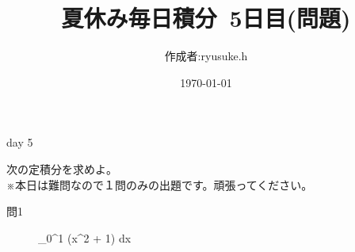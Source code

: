 \documentclass[12pt,a4paper]{jsarticle}
\title{夏休み毎日積分~5日目(問題)}
\date{\today}
\begin{document}
\maketitle
\begin{flushright}
    \author{作成者:ryusuke.h}
\end{flushright}
\begin{itembox}[c]{day 5 }
    \begin{center}
        次の定積分を求めよ。\\
        ※本日は難問なので１問のみの出題です。頑張ってください。
    \end{center}
\end{itembox}
\begin{description}
    \item [問1] {\displaystyle}\int_0^1 \log(x^2 + 1) dx
\end{description}
\end{document}
